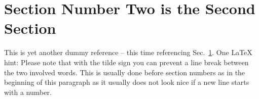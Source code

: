\section{Section Number Two is the Second Section}\label{sec:SecondSection}

This is yet another dummy reference -- this time referencing Sec.~\ref{sec:SecondSection}. One \LaTeX{} hint: Please note that with the tilde sign you can prevent a line break between the two involved words. This is usually done before section numbers as in the beginning of this paragraph as it usually does not look nice if a new line starts with a number.
